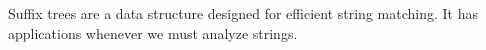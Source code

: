\documentclass{article}
\title{}
\author{}
\theoremstyle{break}
\theoremstyle{break}
\begin{document}

Suffix trees are a data structure designed for efficient
string matching. It has applications whenever we must analyze
strings. \\
\end{document}
